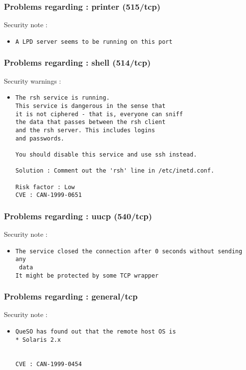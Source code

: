 \documentclass{article}
\begin{document}
\subsubsection{Problems regarding : printer (515/tcp)}
Security note :\\
\begin{itemize}
\item \begin{verbatim}
A LPD server seems to be running on this port
\end{verbatim}\end{itemize}
\subsubsection{Problems regarding : shell (514/tcp)}
Security warnings :\\
\begin{itemize}
\item \begin{verbatim}
The rsh service is running.
This service is dangerous in the sense that
it is not ciphered - that is, everyone can sniff
the data that passes between the rsh client
and the rsh server. This includes logins
and passwords.

You should disable this service and use ssh instead.

Solution : Comment out the 'rsh' line in /etc/inetd.conf.

Risk factor : Low
CVE : CAN-1999-0651
\end{verbatim}\end{itemize}
\subsubsection{Problems regarding : uucp (540/tcp)}
Security note :\\
\begin{itemize}
\item \begin{verbatim}
The service closed the connection after 0 seconds without sending any
 data
It might be protected by some TCP wrapper

\end{verbatim}\end{itemize}
\subsubsection{Problems regarding : general/tcp}
Security note :\\
\begin{itemize}
\item \begin{verbatim}
QueSO has found out that the remote host OS is 
* Solaris 2.x


CVE : CAN-1999-0454
\end{verbatim}\end{itemize}
\end{document}
